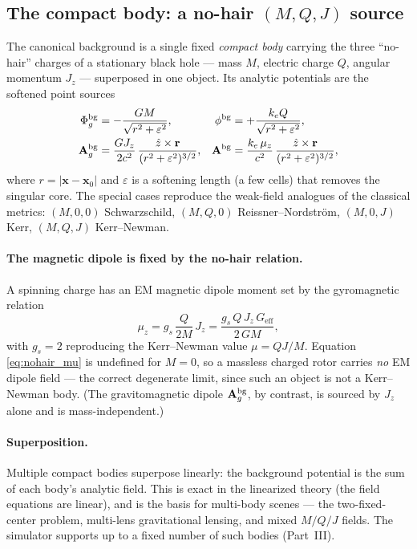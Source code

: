 \documentclass[11pt]{article}
\newcommand{\Phig}{\Phi_g}                 %
\newcommand{\Ag}{\mathbf{A}_g}             %
\newcommand{\vv}[1]{\mathbf{#1}}           %
\newcommand{\Geff}{G_{\mathrm{eff}}}
\newcommand{\keff}{k_e}
\begin{document}
\subsection{The compact body: a no-hair \texorpdfstring{$(M,Q,J)$}{(M,Q,J)} source}
\label{sec:compactbody}

The canonical background is a single fixed \emph{compact body} carrying the three
``no-hair'' charges of a stationary black hole --- mass $M$, electric charge
$Q$, angular momentum $J_z$ --- superposed in one object.  Its analytic
potentials are the softened point sources
\begin{align}
  \Phig^{\rm bg} &= -\frac{GM}{\sqrt{r^2+\varepsilon^2}}, &
  \phi^{\rm bg}  &= +\frac{\keff Q}{\sqrt{r^2+\varepsilon^2}}, \\
  \Ag^{\rm bg}   &= \frac{G J_z}{2c^2}\,\frac{\hat z\times\vv{r}}{(r^2+\varepsilon^2)^{3/2}}, &
  \vv{A}^{\rm bg} &= \frac{\keff\,\mu_z}{c^2}\,\frac{\hat z\times\vv{r}}{(r^2+\varepsilon^2)^{3/2}},
\end{align}
where $r=|\vv{x}-\vv{x}_0|$ and $\varepsilon$ is a softening length (a few
cells) that removes the singular core.  The special cases reproduce the
weak-field analogues of the classical metrics: $(M,0,0)$ Schwarzschild,
$(M,Q,0)$ Reissner--Nordstr\"om, $(M,0,J)$ Kerr, $(M,Q,J)$ Kerr--Newman.

\paragraph{The magnetic dipole is fixed by the no-hair relation.}
A spinning charge has an EM magnetic dipole moment set by the gyromagnetic
relation
\begin{equation}
\label{eq:nohair_mu}
  \mu_z = g_s\,\frac{Q}{2M}\,J_z
        = \frac{g_s\,Q\,J_z\,\Geff}{2\,GM},
\end{equation}
with $g_s=2$ reproducing the Kerr--Newman value $\mu=QJ/M$.  Equation
\eqref{eq:nohair_mu} is undefined for $M=0$, so a massless charged rotor carries
\emph{no} EM dipole field --- the correct degenerate limit, since such an object
is not a Kerr--Newman body.  (The gravitomagnetic dipole $\Ag^{\rm bg}$, by
contrast, is sourced by $J_z$ alone and is mass-independent.)

\paragraph{Superposition.}
Multiple compact bodies superpose linearly: the background potential is the sum
of each body's analytic field. This is exact in the linearized theory (the field
equations are linear), and is the basis for multi-body scenes --- the
two-fixed-center problem, multi-lens gravitational lensing, and mixed
$M/Q/J$ fields. The simulator supports up to a fixed number of such bodies
(Part~III).
\end{document}
